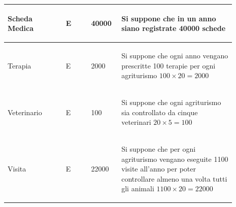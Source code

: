 \documentclass[12pt,a4paper]{article}
\begin{document}
\begin{center}
\begin{longtable}{|p{0.23\linewidth}|p{0.1\linewidth}|p{0.11\linewidth}|p{0.45\linewidth}|}
\hline
Scheda Medica
 & 
\begin{center}\vspace{-25pt}E\end{center}
 & 
\begin{center}\vspace{-25pt}40000\end{center}
 & 
\begin{flushleft}\vspace{-25pt}Si suppone che in un anno siano registrate 40000 schede\end{flushleft}
\\

\hline
Terapia
 & 
\begin{center}\vspace{-25pt}E\end{center}
 & 
\begin{center}\vspace{-25pt}2000\end{center}
 & 
\begin{flushleft}\vspace{-25pt}Si suppone che ogni anno vengano prescritte 100 terapie per ogni agriturismo $100\times 20= 2000$\end{flushleft}
\\

\hline
Veterinario
 & 
\begin{center}\vspace{-25pt}E\end{center}
 & 
\begin{center}\vspace{-25pt}100\end{center}
 & 
\begin{flushleft}\vspace{-25pt}Si suppone che ogni agriturismo sia controllato da cinque veterinari $20\times 5= 100$\end{flushleft}
\\

\hline
Visita
 & 
\begin{center}\vspace{-25pt}E\end{center}
 & 
\begin{center}\vspace{-25pt}22000\end{center}
 & 
\begin{flushleft}\vspace{-25pt}Si suppone che per ogni agriturismo vengano eseguite 1100 visite all'anno per poter controllare almeno una volta tutti gli animali $1100\times 20= 22000$\end{flushleft}
\\


\end{longtable}
\end{center}
\end{document}
